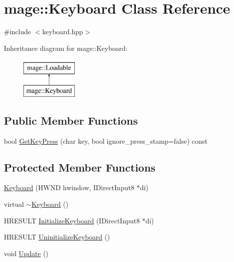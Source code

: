 \hypertarget{classmage_1_1_keyboard}{}\section{mage\+:\+:Keyboard Class Reference}
\label{classmage_1_1_keyboard}


{\ttfamily \#include $<$keyboard.\+hpp$>$}

Inheritance diagram for mage\+:\+:Keyboard\+:\begin{figure}[H]
\begin{center}
\leavevmode
\includegraphics[height=2.000000cm]{classmage_1_1_keyboard}
\end{center}
\end{figure}
\subsection*{Public Member Functions}
\begin{DoxyCompactItemize}
\item 
bool \hyperlink{classmage_1_1_keyboard_a7ba5a3c47b7116afb5b3362739c2a278}{Get\+Key\+Press} (char key, bool ignore\+\_\+press\+\_\+stamp=false) const
\end{DoxyCompactItemize}
\subsection*{Protected Member Functions}
\begin{DoxyCompactItemize}
\item 
\hyperlink{classmage_1_1_keyboard_ac89c8f4132508901ff2ca57c68709928}{Keyboard} (H\+W\+ND hwindow, I\+Direct\+Input8 $\ast$di)
\item 
virtual \hyperlink{classmage_1_1_keyboard_a80a84ec68749fac71690fb45287d446a}{$\sim$\+Keyboard} ()
\item 
H\+R\+E\+S\+U\+LT \hyperlink{classmage_1_1_keyboard_a2ba7225586454bf6fefd8b6648354335}{Initialize\+Keyboard} (I\+Direct\+Input8 $\ast$di)
\item 
H\+R\+E\+S\+U\+LT \hyperlink{classmage_1_1_keyboard_ad1c2b76273cd32b0bb0c335c529d4ad4}{Uninitialize\+Keyboard} ()
\item 
void \hyperlink{classmage_1_1_keyboard_abb5fd91a304f8bbf8b15ab1a277dafaf}{Update} ()
\end{DoxyCompactItemize}
